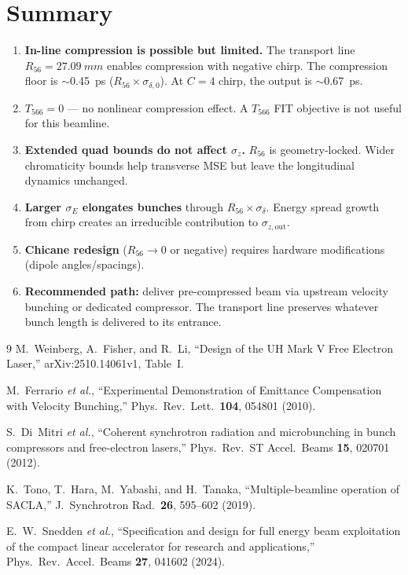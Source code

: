 \documentclass[11pt]{article}
\begin{document}
\section{Summary}

\begin{enumerate}
  \item \textbf{In-line compression is possible but limited.}
    The transport line $R_{56} = \SI{27.09}{mm}$ enables compression with
    negative chirp.  The compression floor is $\sim$\SI{0.45}{ps}
    ($R_{56}\times\sigma_{\delta,0}$).  At $C = 4$ chirp, the output is
    $\sim$\SI{0.67}{ps}.

  \item \textbf{$T_{566} = 0$} --- no nonlinear compression effect.
    A $T_{566}$ FIT objective is not useful for this beamline.

  \item \textbf{Extended quad bounds do not affect $\sigma_z$.}
    $R_{56}$ is geometry-locked.  Wider chromaticity bounds help transverse
    MSE but leave the longitudinal dynamics unchanged.

  \item \textbf{Larger $\sigma_E$ elongates bunches} through
    $R_{56}\times\sigma_\delta$.  Energy spread growth from chirp creates
    an irreducible contribution to $\sigma_{z,\text{out}}$.

  \item \textbf{Chicane redesign} ($R_{56} \to 0$ or negative) requires
    hardware modifications (dipole angles/spacings).

  \item \textbf{Recommended path:} deliver pre-compressed beam via upstream
    velocity bunching or dedicated compressor.  The transport line preserves
    whatever bunch length is delivered to its entrance.
\end{enumerate}


\begin{thebibliography}{9}
  M.~Weinberg, A.~Fisher, and R.~Li,
  ``Design of the UH Mark V Free Electron Laser,''
  arXiv:2510.14061v1, Table~I.

  M.~Ferrario \textit{et al.},
  ``Experimental Demonstration of Emittance Compensation with
  Velocity Bunching,''
  Phys.\ Rev.\ Lett.\ \textbf{104}, 054801 (2010).

  S.~Di~Mitri \textit{et al.},
  ``Coherent synchrotron radiation and microbunching in bunch
  compressors and free-electron lasers,''
  Phys.\ Rev.\ ST Accel.\ Beams \textbf{15}, 020701 (2012).

  K.~Tono, T.~Hara, M.~Yabashi, and H.~Tanaka,
  ``Multiple-beamline operation of SACLA,''
  J.\ Synchrotron Rad.\ \textbf{26}, 595--602 (2019).

  E.~W.~Snedden \textit{et al.},
  ``Specification and design for full energy beam exploitation of the
  compact linear accelerator for research and applications,''
  Phys.\ Rev.\ Accel.\ Beams \textbf{27}, 041602 (2024).
\end{thebibliography}
\end{document}
